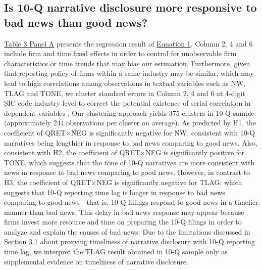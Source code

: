 \documentclass[a4paper]{article}
\begin{document}
\begin{spacing}{2}
\subsection{Is 10-Q narrative disclosure more responsive to bad news than good news?}
\hyperref[T3PA]{Table 3 Panel A} presents the regression result of \hyperref[eq1]{Equation 1}. Column 2, 4 and 6 include firm and time fixed effects in order to control for unobservable firm characteristics or time trends that may bias our estimation. Furthermore, given that reporting policy of firms within a same industry may be similar, which may lead to high correlations among observations in textual variables such as NW, TLAG and TONE, we cluster standard errors in Column 2, 4 and 6 at 4-digit SIC code industry level to correct the potential existence of serial correlation in dependent variables \citep*{petersenEstimatingStandardErrors2009}. Our clustering approach yields 375 clusters in 10-Q sample (approximately 244 observations per cluster on average). As predicted by H1, the coefficient of QRET$\times$NEG is significantly negative for NW, consistent with 10-Q narratives being lengthier in response to bad news comparing to good news. Also, consistent with H2, the coefficient of QRET$\times$NEG is significantly positive for TONE, which suggests that the tone of 10-Q narratives are more consistent with news in response to bad news comparing to good news. However, in contrast to H3, the coefficient of QRET$\times$NEG is significantly negative for TLAG, which suggests that 10-Q reporting time lag is longer in response to bad news comparing to good news---that is, 10-Q fillings respond to good news in a timelier manner than bad news. This delay in bad news response may appear because firms invest more resource and time on preparing the 10-Q filings in order to analyze and explain the causes of bad news. Due to the limitations discussed in \hyperref[sec3.1]{Section 3.1} about proxying timeliness of narrative disclosure with 10-Q reporting time lag, we interpret the TLAG result obtained in 10-Q sample only as supplemental evidence on timeliness of narrative disclosure.


\end{spacing}
\end{document}
